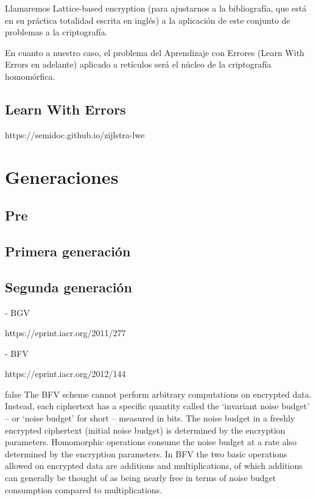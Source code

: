 Llamaremos Lattice-based encryption (para ajustarnos a la bibliografía, que está en su práctica totalidad escrita en inglés) a la aplicación de este conjunto de problemas a la criptografía.

En cuanto a nuestro caso, el problema del Aprendizaje con Errores (Learn With Errors en adelante) aplicado a retículos será el núcleo de la criptografía homomórfica.

\subsection{Learn With Errors}

https://semidoc.github.io/zijlstra-lwe

\section{Generaciones}

\subsection{Pre}



\subsection{Primera generación}



\subsection{Segunda generación}

- BGV

https://eprint.iacr.org/2011/277

- BFV

https://eprint.iacr.org/2012/144

\if false
The BFV scheme cannot perform arbitrary computations on encrypted data.
    Instead, each ciphertext has a specific quantity called the `invariant noise
    budget' -- or `noise budget' for short -- measured in bits. The noise budget
    in a freshly encrypted ciphertext (initial noise budget) is determined by
    the encryption parameters. Homomorphic operations consume the noise budget
    at a rate also determined by the encryption parameters. In BFV the two basic
    operations allowed on encrypted data are additions and multiplications, of
    which additions can generally be thought of as being nearly free in terms of
    noise budget consumption compared to multiplications.
\fi


